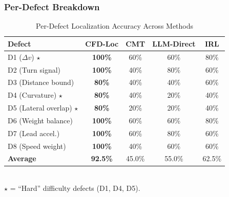 \documentclass[conference]{IEEEtran}
\theoremstyle{plain}
\newcommand{\methodname}{\textbf{CFD-Loc}}
\begin{document}
\subsubsection{Per-Defect Breakdown}
\begin{table}[h]
\centering
\caption{Per-Defect Localization Accuracy Across Methods}
\label{tab:per_defect}
\small
\begin{tabular}{lcccc}
\toprule
\textbf{Defect} & \textbf{\methodname} & \textbf{CMT} & \textbf{LLM-Direct} & \textbf{IRL}\\\midrule
D1 ($\Delta v$) $\star$ & \textbf{100\%} & 60\% & 60\% & 80\%\\
D2 (Turn signal) & \textbf{100\%} & 40\% & 80\% & 60\%\\
D3 (Distance bound) & \textbf{80\%} & 40\% & 40\% & 60\%\\
D4 (Curvature) $\star$ & \textbf{80\%} & 40\% & 20\% & 40\%\\
D5 (Lateral overlap) $\star$ & \textbf{80\%} & 20\% & 20\% & 40\%\\
D6 (Weight balance) & \textbf{100\%} & 60\% & 60\% & 80\%\\
D7 (Lead accel.) & \textbf{100\%} & 60\% & 80\% & 60\%\\
D8 (Speed weight) & \textbf{100\%} & 40\% & 60\% & 60\%\\
\midrule
\textbf{Average} & \textbf{92.5\%} & 45.0\% & 55.0\% & 62.5\%\\
\bottomrule
\end{tabular}
\\[2pt]
\noindent\small $\star$ = ``Hard'' difficulty defects (D1, D4, D5).
\end{table}
\end{document}
